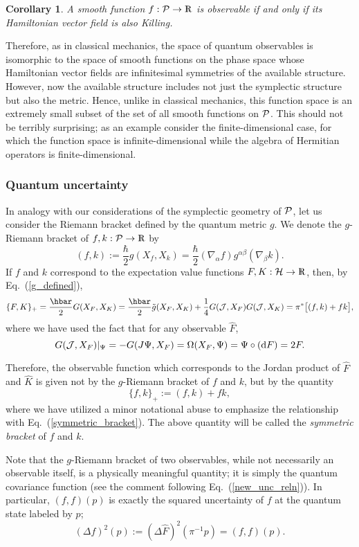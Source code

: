 \documentclass[12pt,aps,eqsecnum,tighten]{revtex4-2}
\def\be{\begin{equation}}
\def\ee{\end{equation}}
\def\a{\alpha}
\def\b{\beta}
\def\d{{\mathrm d}}
\def\grad{\nabla}
\def\H{{\cal H}}
\def\P{{\cal P}}
\def\W{\Omega}
\def\J{{\cal J}}
\newcommand{\eqn}[1]{Eq.~(\ref{#1})}
\newcommand{\hvf}[1]{{X_{#1}}}
\newtheorem{cor}{Corollary}
\def\Rl{{\mathchoice 
{\setbox0=\hbox{$\displaystyle\rm R$}\hbox{\hbox to0pt
{\kern0.4\wd0\vrule height0.9\ht0\hss}\box0}}
{\setbox0=\hbox{$\textstyle\rm R$}\hbox{\hbox to0pt
{\kern0.4\wd0\vrule height0.9\ht0\hss}\box0}}
{\setbox0=\hbox{$\scriptstyle\rm R$}\hbox{\hbox to0pt
{\kern0.4\wd0\vrule height0.9\ht0\hss}\box0}}
{\setbox0=\hbox{$\scriptscriptstyle\rm R$}\hbox{\hbox to0pt
{\kern0.4\wd0\vrule height0.9\ht0\hss}\box0}}}}
\def\Rl{{\mathchoice
{\setbox0=\hbox{$\displaystyle\rm R$}\hbox{\hbox to0pt
{\kern0.4\wd0\vrule height0.9\ht0\hss}\box0}}
{\setbox0=\hbox{$\textstyle\rm R$}\hbox{\hbox to0pt
{\kern0.4\wd0\vrule height0.9\ht0\hss}\box0}}
{\setbox0=\hbox{$\scriptstyle\rm R$}\hbox{\hbox to0pt
{\kern0.4\wd0\vrule height0.9\ht0\hss}\box0}}
{\setbox0=\hbox{$\scriptscriptstyle\rm R$}\hbox{\hbox to0pt
{\kern0.4\wd0\vrule height0.9\ht0\hss}\box0}}}}
\def\R{\Rl}
\begin{document}
%
\begin{cor}
A smooth function $f:\P\rightarrow\R$ is observable if and only if its
Hamiltonian vector field is also Killing.
\end{cor}
%
Therefore, as in classical mechanics, the space of quantum observables
is isomorphic to the space of smooth functions on the phase space
whose Hamiltonian vector fields are infinitesimal symmetries of the
available structure.  However, now the available structure includes
not just the symplectic structure but also the metric. Hence, unlike
in classical mechanics, this function space is an extremely small
subset of the set of all smooth functions on $\P$.  This should not be
terribly surprising; as an example consider the finite-dimensional
case, for which the function space is infinite-dimensional while the
algebra of Hermitian operators is finite-dimensional.


\subsubsection{Quantum uncertainty}

In analogy with our considerations of the symplectic geometry of $\P$,
let us consider the Riemann bracket defined by the quantum metric $g$.
We denote the $g$-Riemann bracket of $f,k : \P \rightarrow \R$ by
%
\be
( f, k ) := \frac{\hbar}{2} g( \hvf{f}, \hvf{k} )
	  = \frac{\hbar}{2} (\grad_\a f) g^{\a\b} (\grad_\b k).
\ee
%
If $f$ and $k$ correspond to the expectation value functions
$F, K : \H \rightarrow \R$, then, by \eqn{g_defined},
%
\be
\{ F, K \}_+  = \frac{\hbar}{2} G( \hvf{F}, \hvf{K} )
= \frac{\hbar}{2} \tilde{g} ( \hvf{F}, \hvf{K})
+ \frac{1}{4} G( \J,\hvf{F} ) G( \J,\hvf{K} )
= \pi^* \big[ (f,k) + fk \big],
\ee
%
where we have used the fact that for any observable $\hat{F}$,
%
\be
G(\J, \hvf{F})|_\Psi = - G(J\Psi, \hvf{F}) 
= \W( \hvf{F}, \Psi ) = \Psi \circ (\d F) = 2F.
\ee
%

Therefore, the observable function which corresponds to the Jordan
product of $\hat{F}$ and $\hat{K}$ is given not by the $g$-Riemann
bracket of $f$ and $k$, but by the quantity
%
\be \label{symmetric_bracket2}
\{ f, k \}_+  := ( f, k) + fk,		
\ee
%
where we have utilized a minor notational abuse to emphasize the
relationship with \eqn{symmetric_bracket}.  The above quantity will be
called the {\em symmetric bracket} of $f$ and $k$.

Note that the $g$-Riemann bracket of two observables, while not
necessarily an observable itself, is a physically meaningful quantity;
it is simply the quantum covariance function (see the comment
following \eqn{new_unc_reln}).  In particular, $(f, f)(p)$ is exactly
the squared uncertainty of $f$ at the quantum state labeled by $p$;
%
\be \label{new_uncertainty}
(\Delta f)^2(p) := (\Delta \hat{F})^2(\pi^{-1}p) = (f, f)(p).
\ee
%
\end{document}
